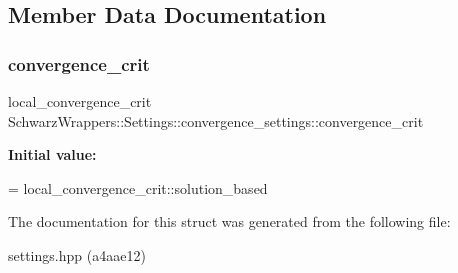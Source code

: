 \subsection{Member Data Documentation}
\mbox{\label{structSchwarzWrappers_1_1Settings_1_1convergence__settings_ac02528dbce2827b664ba9e7545f1cfdc}} 
\subsubsection{\texorpdfstring{convergence\+\_\+crit}{convergence\_crit}}
{\footnotesize\ttfamily local\+\_\+convergence\+\_\+crit Schwarz\+Wrappers\+::\+Settings\+::convergence\+\_\+settings\+::convergence\+\_\+crit}

{\bfseries Initial value\+:}
\begin{DoxyCode}
=
            local\_convergence\_crit::solution\_based
\end{DoxyCode}


The documentation for this struct was generated from the following file\+:\begin{DoxyCompactItemize}
\item 
settings.\+hpp (a4aae12)\end{DoxyCompactItemize}
